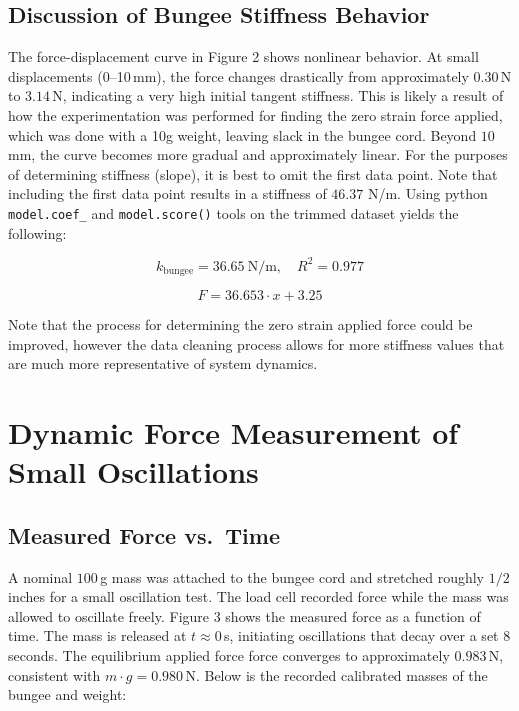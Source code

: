 \documentclass{article}
\begin{document}
\subsection{Discussion of Bungee Stiffness Behavior}

The force-displacement curve in Figure 2 shows nonlinear behavior. At small displacements (0–10\,mm), the force changes drastically from approximately $0.30$\,N to $3.14$\,N, indicating a very high initial tangent stiffness. This is likely a result of how the experimentation was performed for finding the zero strain force applied, which was done with a 10g weight, leaving slack in the bungee cord. Beyond $10$\,mm, the curve becomes more gradual and approximately linear. For the purposes of determining stiffness (slope), it is best to omit the first data point. Note that including the first data point results in a stiffness of $46.37$ N/m. Using python \texttt{model.coef\_} and \texttt{model.score()} tools on the trimmed dataset yields the following:

\begin{equation}
    k_\text{bungee} = 36.65\ \text{N/m}, \quad R^2 = 0.977
\end{equation}

\begin{equation}
    F = 36.653\cdot x + 3.25
\end{equation}

\noindent Note that the process for determining the zero strain applied force could be improved, however the data cleaning process allows for more stiffness values that are much more representative of system dynamics.

\section{Dynamic Force Measurement of Small Oscillations}

\subsection{Measured Force vs.\ Time}

A nominal $100$\,g mass was attached to the bungee cord and stretched roughly $1/2$ inches for a small oscillation test. The load cell recorded force while the mass was allowed to oscillate freely. Figure 3 shows the measured force as a function of time. The mass is released at $t \approx 0$\,s, initiating oscillations that decay over a set 8 seconds. The equilibrium applied force force converges to approximately $0.983$\,N, consistent with $m \cdot g = 0.980$\,N. Below is the recorded calibrated masses of the bungee and weight:
\end{document}
